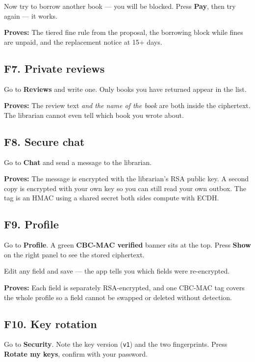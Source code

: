 \documentclass[11pt]{article}
\newcommand{\proof}[1]{\textcolor{ok}{\textbf{Proves:}} #1}
\begin{document}
Now try to borrow another book --- you will be blocked. Press \textbf{Pay},
then try again --- it works.

\proof{The tiered fine rule from the proposal, the borrowing block while fines
are unpaid, and the replacement notice at 15+ days.}

\subsection*{F7. Private reviews}

Go to \textbf{Reviews} and write one. Only books you have returned appear in
the list.

\proof{The review text \emph{and the name of the book} are both inside the
ciphertext. The librarian cannot even tell which book you wrote about.}

\subsection*{F8. Secure chat}

Go to \textbf{Chat} and send a message to the librarian.

\proof{The message is encrypted with the librarian's RSA public key. A second
copy is encrypted with your own key so you can still read your own outbox. The
tag is an HMAC using a shared secret both sides compute with ECDH.}

\subsection*{F9. Profile}

Go to \textbf{Profile}. A green \textbf{CBC-MAC verified} banner sits at the
top. Press \textbf{Show} on the right panel to see the stored ciphertext.

Edit any field and save --- the app tells you which fields were re-encrypted.

\proof{Each field is separately RSA-encrypted, and one CBC-MAC tag covers the
whole profile so a field cannot be swapped or deleted without detection.}

\subsection*{F10. Key rotation}

Go to \textbf{Security}. Note the key version (\texttt{v1}) and the two
fingerprints. Press \textbf{Rotate my keys}, confirm with your password.
\end{document}
